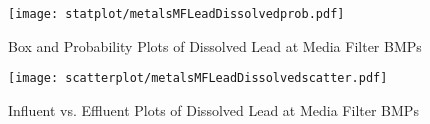         \begin{figure}[hb]   %
            \centering
            \texttt{[image: statplot/metalsMFLeadDissolvedprob.pdf]}
            \caption{Box and Probability Plots of Dissolved Lead at Media Filter BMPs}
        \end{figure}         %
        
        
        \begin{figure}[hb]   %
            \centering
            \texttt{[image: scatterplot/metalsMFLeadDissolvedscatter.pdf]}
            \caption{Influent vs. Effluent Plots of Dissolved Lead at Media Filter BMPs}
        \end{figure}         %
        \clearpage
        